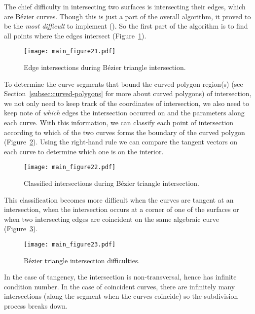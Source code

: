 \documentclass[letterpaper,10pt]{article}
\theoremstyle{definition}
\begin{document}
The chief difficulty in intersecting two surfaces is intersecting their edges,
which are B\'{e}zier curves.
Though this is just a part of the overall algorithm, it proved to be the
\emph{most difficult} to implement (\cite{Hermes2017}). So the first part
of the algorithm is to find all points
where the edges intersect (Figure~\ref{fig:edge-intersections}).

\begin{figure}
  \texttt{[image: main\_figure21.pdf]}
  \centering
  \captionsetup{width=.75\linewidth}
  \caption{Edge intersections during B\'{e}zier triangle intersection.}
  \label{fig:edge-intersections}
\end{figure}

To determine the curve segments that bound the curved polygon region(s)
(see Section~\ref{subsec:curved-polygons} for more about curved polygons) of
intersection, we not only need to keep track
of the coordinates of intersection, we also need to keep note of
\emph{which} edges the intersection occurred on and the parameters along
each curve.
With this information, we can classify each point of intersection
according to which of the two curves forms the boundary of the
curved polygon (Figure~\ref{fig:intersection-classification}).
Using the right-hand rule we can compare the tangent
vectors on each curve to determine which one is on the interior.

\begin{figure}
  \texttt{[image: main\_figure22.pdf]}
  \centering
  \captionsetup{width=.75\linewidth}
  \caption{Classified intersections during B\'{e}zier triangle intersection.}
  \label{fig:intersection-classification}
\end{figure}

This classification becomes more difficult when the curves
are tangent at an intersection, when the intersection occurs at a corner
of one of the surfaces or when two intersecting edges are coincident
on the same algebraic curve (Figure~\ref{fig:intersection-difficulties}).

\begin{figure}
  \texttt{[image: main\_figure23.pdf]}
  \centering
  \captionsetup{width=.75\linewidth}
  \caption{B\'{e}zier triangle intersection difficulties.}
  \label{fig:intersection-difficulties}
\end{figure}

In the case of tangency, the intersection is non-transversal, hence has
infinite condition number. In the case of coincident curves, there are
infinitely many intersections (along the segment when the curves
coincide) so the subdivision process breaks down.
\end{document}
